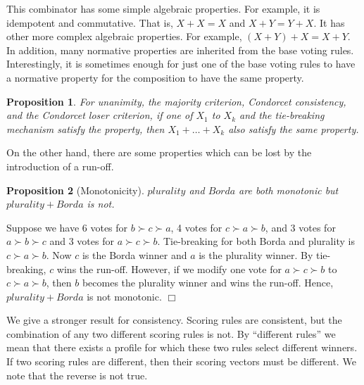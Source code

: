 \documentclass{ecai2012}
\newcommand{\winner}[2]{\mbox{$#1 + #2$}}
\newcommand{\winners}[3]{\mbox{$#1 + #2 + #3$}}
\newtheorem{proposition}{Proposition}
\newcommand{\myproof}{\vspace{-3mm}\noindent {\bf Proof:\ \ }}
\newcommand{\myqed}{\mbox{$\Box$}}
\newcommand\lirong[1]{}
\begin{document}
This combinator has some simple algebraic properties.
For example, it is idempotent and commutative.
That is, $\winner{X}{X}=X$ and
$\winner{X}{Y}=\winner{Y}{X}$.
It has %
other more complex algebraic
properties. For example,
$\winner{(\winner{X}{Y})}{X}=\winner{X}{Y}$.
In addition, many normative properties are inherited from the
base voting rules.
Interestingly,
it is sometimes enough for just one of the base
voting rules to have a normative property
for the composition to have the same property.



\begin{proposition}
For unanimity, the majority criterion, Condorcet consistency,
and the Condorcet loser criterion,
if one of $X_1$ to $X_k$ and the tie-breaking
mechanism satisfy the property,
then $\winners{X_1}{\ldots}{X_k}$ also satisfy the same property.
\lirong{I commented out a seemingly duplicated sentence.}
\end{proposition}

On the other hand, there are some properties
which can be lost by the introduction of a run-off.

\begin{proposition}[Monotonicity]
$plurality$ and $Borda$ are both monotonic but
$\winner{plurality}{Borda}$ is not.
\end{proposition}
\myproof
Suppose we have 6 votes for
$b\succ c\succ a$,\lirong{There was a typo ($\prec$ should be $\succ$), which is corrected now.}
4 votes for $c \succ a \succ b$,
and 3 votes for  $a \succ b \succ c$ and 3 votes for
$a \succ c \succ b$.
Tie-breaking for both Borda and plurality is $c \succ a \succ b$.
Now $c$ is the Borda winner and $a$ is the plurality winner.
By tie-breaking, $c$ wins the run-off.
However, if we modify one
vote for $a \succ c \succ b$ to $c \succ a \succ b$,
then $b$ becomes the plurality winner
and wins the run-off.
Hence, $\winner{plurality}{Borda}$ is not
monotonic.
\myqed

We give a stronger %
result for
consistency. Scoring rules are consistent, but
the combination of any two different scoring rules
is not. By ``different rules'' we mean that there exists a profile for which these two rules select different winners. If two scoring rules are different, then their scoring vectors must be different. We note that the reverse is not true.
\end{document}
